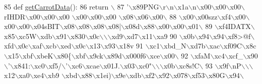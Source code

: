 \begin{DoxyCode}
85 \textcolor{keyword}{def }\hyperlink{namespaceimages_a0c5ea40e98df45c2f313e28639a2b321}{getCarrotData}():
86     \textcolor{keywordflow}{return} \(\backslash\)
87 \textcolor{stringliteral}{'\(\backslash\)x89PNG\(\backslash\)r\(\backslash\)n\(\backslash\)x1a\(\backslash\)n\(\backslash\)x00\(\backslash\)x00\(\backslash\)x00\(\backslash\)rIHDR\(\backslash\)x00\(\backslash\)x00\(\backslash\)x00 \(\backslash\)x00\(\backslash\)x00\(\backslash\)x00 \(\backslash\)x08\(\backslash\)x06\(\backslash\)x00\(\backslash\)}
88 \textcolor{stringliteral}{\(\backslash\)x00\(\backslash\)x00szz\(\backslash\)xf4\(\backslash\)x00\(\backslash\)x00\(\backslash\)x00\(\backslash\)x04sBIT\(\backslash\)x08\(\backslash\)x08\(\backslash\)x08\(\backslash\)x08|\(\backslash\)x08d\(\backslash\)x88\(\backslash\)x00\(\backslash\)x00\(\backslash\)x01\(\backslash\)}
89 \textcolor{stringliteral}{\(\backslash\)xf4IDATX\(\backslash\)x85\(\backslash\)xc5W\(\backslash\)xdb\(\backslash\)x91\(\backslash\)x830\(\backslash\)x0c\(\backslash\)\(\backslash\)\(\backslash\)xd9\(\backslash\)xd7\(\backslash\)x11\(\backslash\)xa9%
90 \textcolor{stringliteral}{\(\backslash\)x0b\(\backslash\)x94\(\backslash\)x94\(\backslash\)xf8>@f\(\backslash\)xfd\(\backslash\)x0c\(\backslash\)xaf\(\backslash\)xcb\(\backslash\)xed\(\backslash\)x0c\(\backslash\)x13\(\backslash\)x93\(\backslash\)x18v%
91 \textcolor{stringliteral}{\(\backslash\)xc1\(\backslash\)xbd\_N\(\backslash\)xd7b\(\backslash\)xac\(\backslash\)xf09C\(\backslash\)x8c\(\backslash\)x15\(\backslash\)xbf\(\backslash\)xbeK\(\backslash\)x80\{\(\backslash\)xbf\(\backslash\)x9ck\(\backslash\)x89d\(\backslash\)x000f6\(\backslash\)xce\(\backslash\)x00\(\backslash\)}
92 \textcolor{stringliteral}{\(\backslash\)xfaM\(\backslash\)xc4\(\backslash\)xcf\_\(\backslash\)x90\(\backslash\)'\(\backslash\)x841:\(\backslash\)xc0\(\backslash\)xf5/\(\backslash\)'\(\backslash\)xc6\(\backslash\)xcae\(\backslash\)x01J.\(\backslash\)x03\(\backslash\)xc0"\(\backslash\)\(\backslash\)\(\backslash\)x0b\(\backslash\)xc8s!C\(\backslash\)}
93 \textcolor{stringliteral}{\(\backslash\)x9f\(\backslash\)nP\(\backslash\)\(\backslash\)\(\backslash\)x12\(\backslash\)xa0\(\backslash\)xe4\(\backslash\)xb9 \(\backslash\)xbd\(\backslash\)x88\(\backslash\)x1ei)\(\backslash\)x9e\(\backslash\)xdb\(\backslash\)xf2\(\backslash\)x92\(\backslash\)x078\(\backslash\)xf53\(\backslash\)x80G\(\backslash\)x94\(\backslash\)}
}}
\end{DoxyCode}
